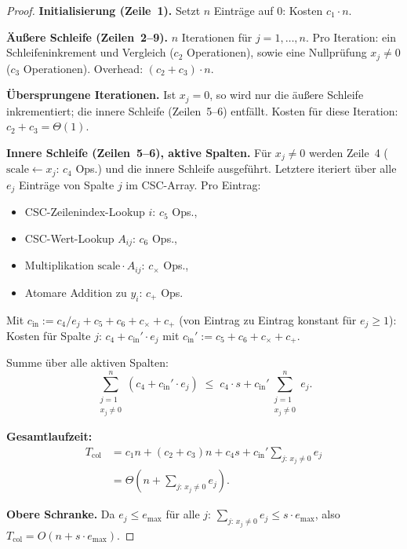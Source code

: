 \documentclass[a4paper,12pt]{report}
\theoremstyle{definition}
\begin{document}
	\begin{proof}
		\textbf{Initialisierung (Zeile~1).} Setzt $n$ Einträge auf $0$: Kosten $c_1 \cdot n$.

		\textbf{Äußere Schleife (Zeilen~2--9).} $n$ Iterationen für $j = 1, \ldots, n$. Pro Iteration: ein Schleifeninkrement und Vergleich ($c_2$ Operationen), sowie eine Nullprüfung $x_j \neq 0$ ($c_3$ Operationen). Overhead: $(c_2 + c_3) \cdot n$.

		\textbf{Übersprungene Iterationen.} Ist $x_j = 0$, so wird nur die äußere Schleife inkrementiert; die innere Schleife (Zeilen~5--6) entfällt. Kosten für diese Iteration: $c_2 + c_3 = \Theta(1)$.

		\textbf{Innere Schleife (Zeilen~5--6), aktive Spalten.} Für $x_j \neq 0$ werden Zeile~4 ($\mathrm{scale} \gets x_j$: $c_4$ Ops.) und die innere Schleife ausgeführt. Letztere iteriert über alle $e_j$ Einträge von Spalte $j$ im CSC-Array. Pro Eintrag:
		\begin{itemize}
			\item CSC-Zeilenindex-Lookup $i$: $c_5$ Ops.,
			\item CSC-Wert-Lookup $A_{ij}$: $c_6$ Ops.,
			\item Multiplikation $\mathrm{scale} \cdot A_{ij}$: $c_\times$ Ops.,
			\item Atomare Addition zu $y_i$: $c_+$ Ops.
		\end{itemize}
		Mit $c_{\mathrm{in}} := c_4 / e_j + c_5 + c_6 + c_\times + c_+$ (von Eintrag zu Eintrag konstant für $e_j \geq 1$): Kosten für Spalte $j$: $c_4 + c_{\mathrm{in}}' \cdot e_j$ mit $c_{\mathrm{in}}' := c_5 + c_6 + c_\times + c_+$.

		Summe über alle aktiven Spalten:
		\[
			\sum_{\substack{j=1 \\ x_j \neq 0}}^{n} \!\! \left(c_4 + c_{\mathrm{in}}' \cdot e_j\right)
			\;\leq\; c_4 \cdot s + c_{\mathrm{in}}' \sum_{\substack{j=1 \\ x_j \neq 0}}^{n} e_j.
		\]

		\textbf{Gesamtlaufzeit:}
		\begin{align*}
			T_{\mathrm{col}}
			&= c_1 n + (c_2 + c_3) n + c_4 s + c_{\mathrm{in}}' \sum_{j:\, x_j \neq 0} e_j \\
			&= \Theta\!\left(n + \sum_{j:\, x_j \neq 0} e_j\right).
		\end{align*}

		\textbf{Obere Schranke.} Da $e_j \leq e_{\max}$ für alle $j$:
		$\sum_{j:\, x_j \neq 0} e_j \leq s \cdot e_{\max}$, also $T_{\mathrm{col}} = O(n + s \cdot e_{\max})$.


\end{proof}
\end{document}
